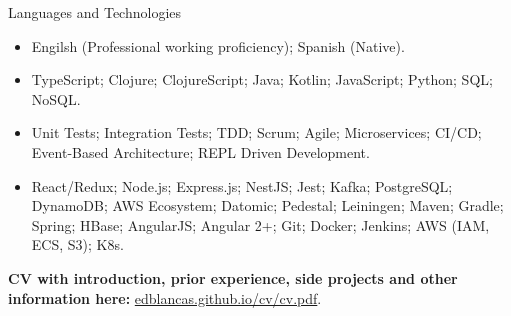 \documentclass[calibri]{../mcdowell-cv/mcdowellcv}
\begin{document}
	\begin{cvsection}{Languages and Technologies}
		\begin{cvsubsection}{}{}{}	
			\begin{itemize}
				\item Engilsh (Professional working proficiency); Spanish (Native).
				\item TypeScript; Clojure; ClojureScript; Java; Kotlin; JavaScript; Python; SQL; NoSQL.
				\item Unit Tests; Integration Tests; TDD; Scrum; Agile; Microservices; CI/CD; Event-Based Architecture; REPL Driven Development.
				\item React/Redux; Node.js; Express.js; NestJS; Jest; Kafka; PostgreSQL; DynamoDB; AWS Ecosystem; Datomic; Pedestal; Leiningen; Maven; Gradle; Spring; HBase; AngularJS; Angular 2+; Git; Docker; Jenkins; AWS (IAM, ECS, S3); K8s.
			\end{itemize}
		\end{cvsubsection}
	\end{cvsection}

	\begin{flushleft}
		\textbf{CV with introduction, prior experience, side projects and other information here:} \href{https://edblancas.github.io/cv/cv.pdf}{edblancas.github.io/cv/cv.pdf}.
	\end{flushleft}
	
\end{document}

